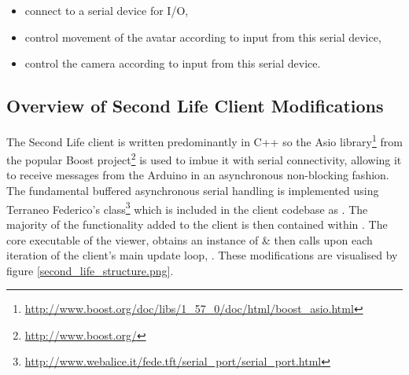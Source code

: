 \begin{itemize}
	\item connect to a serial device for I/O,
	\item control movement of the avatar according to input from this serial device,
	\item control the camera according to input from this serial device.
\end{itemize}


\subsection{Overview of Second Life Client Modifications}

\newcommand{\asioFootnote}{\footnote{\url{http://www.boost.org/doc/libs/1_57_0/doc/html/boost_asio.html}}}

\newcommand{\boostFootnote}{\footnote{\url{http://www.boost.org/}}}

\newcommand{\fedetftFootnote}{\footnote{\url{http://www.webalice.it/fede.tft/serial_port/serial_port.html}}}

\newcommand{\regionmodulelimitationFootnote}{\footnote{This is not due to any limitation on the part of OpenSim, but simply due to the Second Life client modifications being pursued further than the OpenSim module.}}

\newcommand{\megaregionFootnote}{\footnote{\url{http://opensimulator.org/wiki/Setting_Up_Mega-Regions}}}



The Second Life client is written predominantly in C++ so the Asio library\asioFootnote{} from the popular Boost project\boostFootnote{} is used to imbue it with serial connectivity, allowing it to receive messages from the Arduino in an asynchronous non-blocking fashion. The fundamental buffered asynchronous serial handling is implemented using Terraneo Federico's  class\fedetftFootnote{} which is included in the client codebase as . The majority of the functionality added to the client is then contained within . The core executable of the viewer,  obtains an instance of  \& then calls  upon each iteration of the client's main update loop, . These modifications are visualised by figure \ref{second_life_structure.png}.

